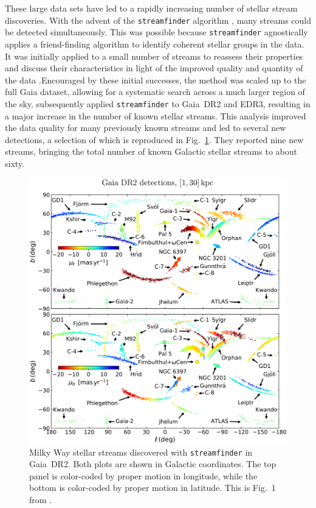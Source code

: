     These large data sets have led to a rapidly increasing number of stellar stream discoveries. With the advent of the \texttt{streamfinder} algorithm \citep{2018MNRAS.477.4063M,2018MNRAS.478.3862M}, many streams could be detected simultaneously. This was possible because \texttt{streamfinder} agnostically applies a friend-finding algorithm to identify coherent stellar groups in the data. It was initially applied to a small number of streams to reassess their properties and discuss their characteristics in light of the improved quality and quantity of the data \citep{2019NatAs...3..667I,2020ApJ...891..161I}.Encouraged by these initial successes, the method was scaled up to the full Gaia dataset, allowing for a systematic search across a much larger region of the sky. \citet{2021ApJ...914..123I} subsequently applied \texttt{streamfinder} to Gaia~DR2 and EDR3, resulting in a major increase in the number of known stellar streams. This analysis improved the data quality for many previously known streams and led to several new detections, a selection of which is reproduced in Fig.~\ref{fig:ibata_2021_fig1}. They reported nine new streams, bringing the total number of known Galactic stellar streams to about sixty. 
    \begin{figure}
        \centering
        \includegraphics[width=\linewidth]{images/ibata-2021.jpeg}
        \caption[Milky Way stellar streams discovered with \texttt{streamfinder} in Gaia DR2]{Milky Way stellar streams discovered with \texttt{streamfinder} in Gaia~DR2. Both plots are shown in Galactic coordinates. The top panel is color-coded by proper motion in longitude, while the bottom is color-coded by proper motion in latitude. This is Fig.~1 from \citet{2021ApJ...914..123I}.}
        \label{fig:ibata_2021_fig1}
    \end{figure}
    

